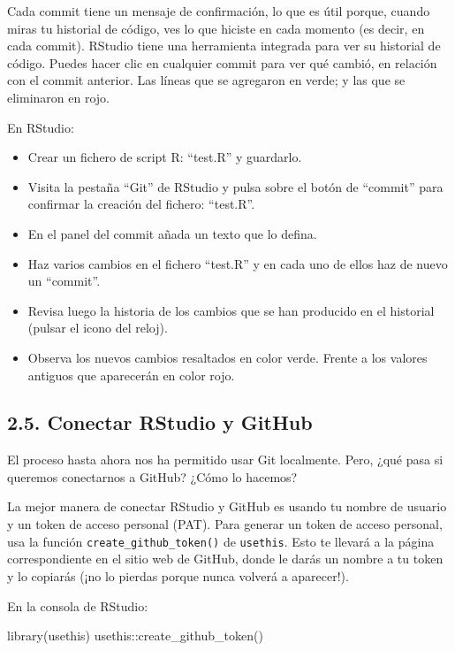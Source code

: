 \documentclass[
  letterpaper,
  DIV=11,
  numbers=noendperiod]{scrreprt}
\newenvironment{Shaded}{\begin{snugshade}}{\end{snugshade}}
\newcommand{\FunctionTok}[1]{\textcolor[rgb]{0.28,0.35,0.67}{#1}}
\newcommand{\NormalTok}[1]{\textcolor[rgb]{0.00,0.23,0.31}{#1}}
\newcommand{\SpecialCharTok}[1]{\textcolor[rgb]{0.37,0.37,0.37}{#1}}
\begin{document}
Cada commit tiene un mensaje de confirmación, lo que es útil porque,
cuando miras tu historial de código, ves lo que hiciste en cada momento
(es decir, en cada commit). RStudio tiene una herramienta integrada para
ver su historial de código. Puedes hacer clic en cualquier commit para
ver qué cambió, en relación con el commit anterior. Las líneas que se
agregaron en verde; y las que se eliminaron en rojo.

En RStudio:

\begin{itemize}
\item
  Crear un fichero de script R: ``test.R'' y guardarlo.
\item
  Visita la pestaña ``Git'' de RStudio y pulsa sobre el botón de
  ``commit'' para confirmar la creación del fichero: ``test.R''.
\item
  En el panel del commit añada un texto que lo defina.
\item
  Haz varios cambios en el fichero ``test.R'' y en cada uno de ellos haz
  de nuevo un ``commit''.
\item
  Revisa luego la historia de los cambios que se han producido en el
  historial (pulsar el icono del reloj).
\item
  Observa los nuevos cambios resaltados en color verde. Frente a los
  valores antiguos que aparecerán en color rojo.
\end{itemize}

\hypertarget{conectar-rstudio-y-github}{%
\subsection{2.5. Conectar RStudio y
GitHub}\label{conectar-rstudio-y-github}}

El proceso hasta ahora nos ha permitido usar Git localmente. Pero, ¿qué
pasa si queremos conectarnos a GitHub? ¿Cómo lo hacemos?

La mejor manera de conectar RStudio y GitHub es usando tu nombre de
usuario y un token de acceso personal (PAT). Para generar un token de
acceso personal, usa la función \texttt{create\_github\_token()} de
\texttt{usethis}. Esto te llevará a la página correspondiente en el
sitio web de GitHub, donde le darás un nombre a tu token y lo copiarás
(¡no lo pierdas porque nunca volverá a aparecer!).

En la consola de RStudio:

\begin{Shaded}
\begin{Highlighting}[]
\FunctionTok{library}\NormalTok{(usethis)}
\NormalTok{usethis}\SpecialCharTok{::}\FunctionTok{create\_github\_token}\NormalTok{()}
\end{Highlighting}
\end{Shaded}
\end{document}
